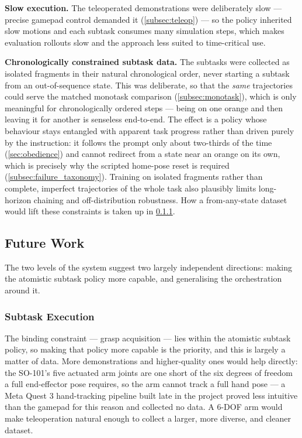 \textbf{Slow execution.} The teleoperated demonstrations were deliberately slow --- precise gamepad control demanded it (\cref{subsec:teleop}) --- so the policy inherited slow motions and each subtask consumes many simulation steps, which makes evaluation rollouts slow and the approach less suited to time-critical use.

\textbf{Chronologically constrained subtask data.} The subtasks were collected as isolated fragments in their natural chronological order, never starting a subtask from an out-of-sequence state. This was deliberate, so that the \emph{same} trajectories could serve the matched monotask comparison (\cref{subsec:monotask}), which is only meaningful for chronologically ordered steps --- being on one orange and then leaving it for another is senseless end-to-end. The effect is a policy whose behaviour stays entangled with apparent task progress rather than driven purely by the instruction: it follows the prompt only about two-thirds of the time (\cref{sec:obedience}) and cannot redirect from a state near an orange on its own, which is precisely why the scripted home-pose reset is required (\cref{subsec:failure_taxonomy}). Training on isolated fragments rather than complete, imperfect trajectories of the whole task also plausibly limits long-horizon chaining and off-distribution robustness. How a from-any-state dataset would lift these constraints is taken up in \cref{subsec:future_subtask}.

\subsection{Future Work}

The two levels of the system suggest two largely independent directions: making the atomistic subtask policy more capable, and generalising the orchestration around it.

\subsubsection{Subtask Execution}
\label{subsec:future_subtask}

The binding constraint --- grasp acquisition --- lies within the atomistic subtask policy, so making that policy more capable is the priority, and this is largely a matter of data. More demonstrations and higher-quality ones would help directly: the SO-101's five actuated arm joints are one short of the six degrees of freedom a full end-effector pose requires, so the arm cannot track a full hand pose --- a Meta Quest 3 hand-tracking pipeline built late in the project proved less intuitive than the gamepad for this reason and collected no data. A 6-DOF arm would make teleoperation natural enough to collect a larger, more diverse, and cleaner dataset.

